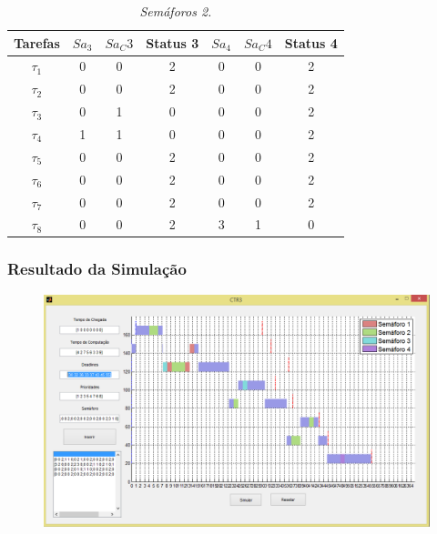 \begin{table}[H]
\centering
\caption{\em Semáforos 2.}
\vspace{0.1cm}
\begin{tabular}{c||c|c|c||c|c|c}
 
Tarefas & $Sa_3$ & $Sa_C3$ & Status 3 & $Sa_4$ & $Sa_C4$ & Status 4\\ 
\hline 
                          
$\tau_1$ & 0 & 0 & 2 & 0 & 0 & 2\\ 
$\tau_2$ & 0 & 0 & 2 & 0 & 0 & 2\\
$\tau_3$ & 0 & 1 & 0 & 0 & 0 & 2\\
$\tau_4$ & 1 & 1 & 0 & 0 & 0 & 2\\
$\tau_5$ & 0 & 0 & 2 & 0 & 0 & 2\\
$\tau_6$ & 0 & 0 & 2 & 0 & 0 & 2\\
$\tau_7$ & 0 & 0 & 2 & 0 & 0 & 2\\
$\tau_8$ & 0 & 0 & 2 & 3 & 1 & 0

\end{tabular}
\end{table}

\subsubsection{Resultado da Simulação}

\begin{figure}[H]
	\centering
	\includegraphics[keepaspectratio,width=1\textwidth]{img/teste4.png}
\end{figure}